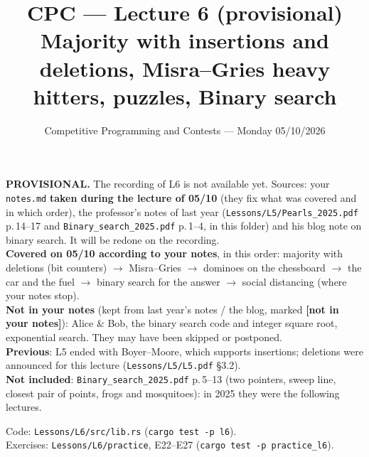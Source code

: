 \documentclass[11pt,a4paper]{article}
\title{\textbf{CPC --- Lecture 6 (provisional)}\\[2pt]\large Majority with insertions and deletions, Misra--Gries heavy hitters, puzzles, Binary search}
\author{Competitive Programming and Contests --- Monday 05/10/2026}
\date{}
\theoremstyle{definition}\newtheorem*{definition}{Definition}
\begin{document}
\maketitle
\vspace{-1.5em}
\begin{warnbox}
\textbf{PROVISIONAL.} The recording of L6 is not available yet. Sources: your \texttt{notes.md} \textbf{taken during the lecture of 05/10}
(they fix what was covered and in which order), the professor's notes of last year
(\texttt{Lessons/L5/Pearls\_2025.pdf} p.\,14--17 and \texttt{Binary\_search\_2025.pdf} p.\,1--4, in this folder) and his blog note on binary search.
It will be redone on the recording.\\
\textbf{Covered on 05/10 according to your notes}, in this order: majority with deletions (bit counters) $\to$ Misra--Gries $\to$ dominoes on the
chessboard $\to$ the car and the fuel $\to$ binary search for the answer $\to$ social distancing (where your notes stop).\\
\textbf{Not in your notes} (kept from last year's notes / the blog, marked \textcolor{warn}{\textbf{[not in your notes]}}): Alice \& Bob, the binary search
code and integer square root, exponential search. They may have been skipped or postponed.\\
\textbf{Previous}: L5 ended with Boyer--Moore, which supports insertions; deletions were announced for this lecture (\texttt{Lessons/L5/L5.pdf} \S3.2).\\
\textbf{Not included}: \texttt{Binary\_search\_2025.pdf} p.\,5--13 (two pointers, sweep line, closest pair of points, frogs and mosquitoes): in 2025 they were the following lectures.
\end{warnbox}

\noindent Code: \texttt{Lessons/L6/src/lib.rs} (\texttt{cargo test -p l6}).\\ Exercises: \texttt{Lessons/L6/practice}, E22--E27 (\texttt{cargo test -p practice\_l6}).

\tableofcontents

\end{document}
